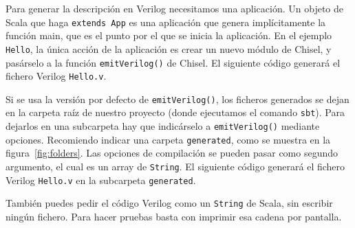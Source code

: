 \documentclass[%
    10pt,
    headinclude, footinclude=false,
    openright, %
    notitlepage,
    cleardoublepage=empty,
    headsepline,
    numbers=noenddot,
    bibliography=totoc, index=totoc,
    ]{scrbook}
\newcommand{\code}[1]{{\lstinline[basicstyle=\small\ttfamily]{#1}}}
\newcommand{\myref}[2]{\href{#1}{#2}}
\renewcommand{\myref}[2]{{#2}{\footnote{\url{#1}}}}
\begin{document}
Para generar la descripción en Verilog necesitamos una aplicación. Un objeto de Scala que haga
\code{extends App} es una aplicación que genera implícitamente la función main, que es el punto por el que se 
inicia la aplicación.
En el ejemplo \code{Hello}, la única acción de la aplicación es crear un nuevo módulo de Chisel, y pasárselo a 
la función \code{emitVerilog()} de Chisel. El siguiente código generará el fichero Verilog \code{Hello.v}.



Si se usa la versión por defecto de \code{emitVerilog()}, los ficheros generados se dejan
en la carpeta raíz de nuestro proyecto (donde ejecutamos el comando \code{sbt}).
Para dejarlos en una subcarpeta hay que indicárselo a \code{emitVerilog()} mediante opciones.
Recomiendo indicar una carpeta \code{generated}, como se muestra en la figura~\ref{fig:folders}.
Las opciones de compilación se pueden pasar como segundo argumento, el cual es un array de \code{String}.
El siguiente código generará el fichero Verilog \code{Hello.v} en la subcarpeta \code{generated}.



También puedes pedir el código Verilog como un \code{String} de Scala, sin escribir ningún fichero.
Para hacer pruebas basta con imprimir esa cadena por pantalla.


\end{document}
